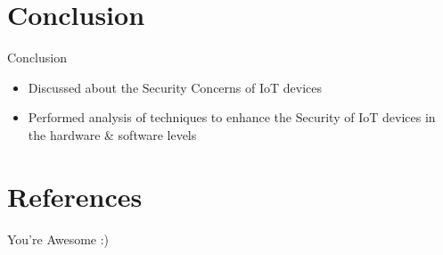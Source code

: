 \documentclass{beamer}
\begin{document}


\section{Conclusion}

\begin{frame}{Conclusion}
    \begin{itemize}
        \item {Discussed about the Security Concerns of IoT devices}
        \item {Performed analysis of techniques to enhance the Security of IoT devices in the hardware \& software levels}
    \end{itemize}
\end{frame}

\section{References}

\begin{frame}[allowframebreaks]
    
    
\end{frame}

\begin{frame}
    \begin{center}
        {\Huge\calligra You're Awesome :)}
    \end{center}
\end{frame}
\end{document}
